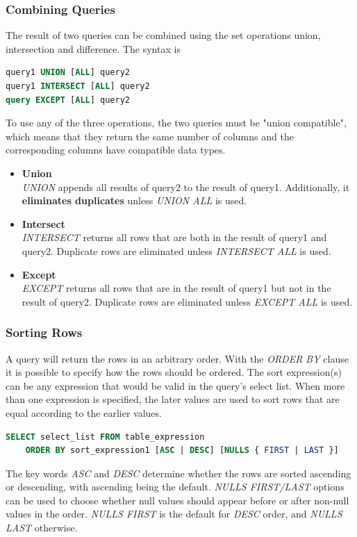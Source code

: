 \subsubsection{Combining Queries}
The result of two queries can be combined using the set operations union, intersection and difference. The syntax is
\begin{lstlisting}[language=SQL]
query1 UNION [ALL] query2
query1 INTERSECT [ALL] query2
query EXCEPT [ALL] query2
\end{lstlisting}
To use any of the three operations, the two queries must be "union compatible", which means that they return the same number of columns and the corresponding columns have compatible data types.
\begin{itemize}
\item \textbf{Union}\\
\textit{UNION} appends all results of query2 to the result of query1. Additionally, it \textbf{eliminates duplicates} unless \textit{UNION ALL} is used.
\item \textbf{Intersect}\\
\textit{INTERSECT} returns all rows that are both in the result of query1 and query2. Duplicate rows are eliminated unless \textit{INTERSECT ALL} is used.
\item \textbf{Except}\\
\textit{EXCEPT} returns all rows that are in the result of query1 but not in the result of query2. Duplicate rows are eliminated unless \textit{EXCEPT ALL} is used.
\end{itemize}

\subsubsection{Sorting Rows}
A query will return the rows in an arbitrary order. With the \textit{ORDER BY} clause it is possible to specify how the rows should be ordered. The sort expression(s) can be any expression that would be valid in the query's select list. When more than one expression is specified, the later values are used to sort rows that are equal according to the earlier values.
\begin{lstlisting}[language=SQL]
SELECT select_list FROM table_expression
	ORDER BY sort_expression1 [ASC | DESC] [NULLS { FIRST | LAST }]
\end{lstlisting}
The key words \textit{ASC} and \textit{DESC} determine whether the rows are sorted ascending or descending, with ascending being the default. \textit{NULLS FIRST/LAST} options can be used to choose whether null values should appear before or after non-null values in the order. \textit{NULLS FIRST} is the default for \textit{DESC} order, and \textit{NULLS LAST} otherwise.

